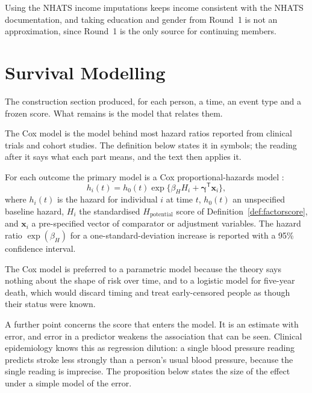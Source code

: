 Using the NHATS income imputations keeps income consistent with the NHATS documentation, and taking education and gender from Round~1 is not an approximation, since Round~1 is the only source for continuing members.

\section{Survival Modelling}
\label{sec:survival}

The construction section produced, for each person, a time, an event type and a frozen score. What remains is the model that relates them.

The Cox model is the model behind most hazard ratios reported from clinical trials and cohort studies. The definition below states it in symbols; the reading after it says what each part means, and the text then applies it.

\begin{definition}
\label{def:cox}
For each outcome the primary model is a Cox proportional-hazards model
\citep{cox_1972}:
\begin{equation}
    h_i(t)=h_0(t)\exp\{\beta_H H_i+\boldsymbol{\gamma}^{\mathsf T}\mathbf{x}_i\},
    \label{eq:cox}
\end{equation}
where $h_i(t)$ is the hazard for individual $i$ at time $t$, $h_0(t)$ an
unspecified baseline hazard, $H_i$ the standardised $H_{\text{potential}}$
score of Definition~\ref{def:factorscore}, and $\mathbf{x}_i$ a pre-specified
vector of comparator or adjustment variables. The hazard ratio
$\exp(\beta_H)$ for a one-standard-deviation increase is reported with a
95\% confidence interval.
\end{definition}

The Cox model is preferred to a parametric model because the theory says nothing about the shape of risk over time, and to a logistic model for five-year death, which would discard timing and treat early-censored people as though their status were known.

A further point concerns the score that enters the model. It is an estimate with error, and error in a predictor weakens the association that can be seen. Clinical epidemiology knows this as regression dilution: a single blood pressure reading predicts stroke less strongly than a person's usual blood pressure, because the single reading is imprecise. The proposition below states the size of the effect under a simple model of the error.

